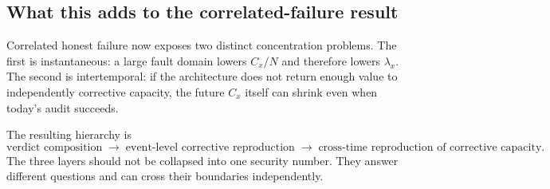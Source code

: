 \subsection{What this adds to the correlated-failure result}

Correlated honest failure now exposes two distinct concentration problems.  The first is instantaneous: a large fault domain lowers \(C_x/N\) and therefore lowers \(\lambda_x\).  The second is intertemporal: if the architecture does not return enough value to independently corrective capacity, the future \(C_x\) itself can shrink even when today's audit succeeds.

The resulting hierarchy is
\[
\boxed{
\text{verdict composition}
\;\longrightarrow\;
\text{event-level corrective reproduction}
\;\longrightarrow\;
\text{cross-time reproduction of corrective capacity}.
}
\]
The three layers should not be collapsed into one security number.  They answer different questions and can cross their boundaries independently.
